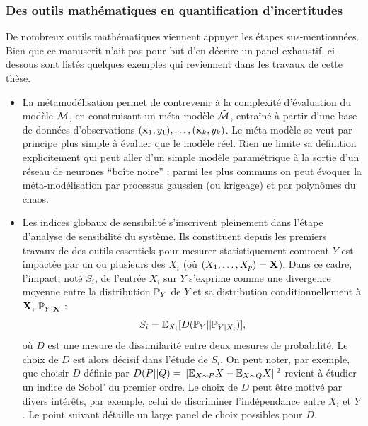 \subsubsection{Des outils mathématiques en quantification d'incertitudes}

De nombreux outils mathématiques viennent appuyer les étapes sus-mentionnées. Bien que ce manuscrit n'ait pas pour but d'en décrire un panel exhaustif, ci-dessous sont listés quelques exemples qui reviennent dans les travaux de cette thèse.

\begin{itemize}
    \item La métamodélisation %
    permet de contrevenir à la complexité d'évaluation du modèle $\mathcal{M}$, en construisant un méta-modèle $\tilde{\mathcal{M}}$, entraîné à partir d'une base de données d'observations $(\mathbf{x}_1, y_1),\dots,(\mathbf{x}_k,y_k)$. Le méta-modèle se veut par principe plus simple à évaluer que le modèle réel. 
    Rien ne limite sa définition explicitement qui peut aller d'un simple modèle paramétrique à la sortie d'un réseau de neurones ``boîte noire'' ; parmi les plus communs on peut évoquer la méta-modélisation par processus gaussien (ou krigeage) et par polynômes du chaos. %
    \item Les indices globaux de sensibilité s'inscrivent pleinement dans l'étape d'analyse de sensibilité du système.
    Ils constituent depuis les premiers travaux de \citet{sobol_sensitivity_1993} des outils essentiels pour mesurer statistiquement comment $ Y$ est impactée par un ou plusieurs des $X_i$ (où $(X_1,\dots,X_p)=\mathbf{X}$). Dans ce cadre, l'impact, noté $S_i$, de l'entrée $X_i$ sur $ Y$ s'exprime comme une divergence moyenne entre la distribution $\mathbb{P}_{ Y}$ de $ Y$ et sa distribution conditionnellement à $\mathbf{X}$, $\mathbb{P}_{Y|\mathbf{X}}$ \citep{da_veiga_global_2015} : 
        \begin{equation}
            S_i = \mathbb{E}_{X_i}[D(\mathbb{P}_{ Y}||\mathbb{P}_{Y|X_i})],
        \end{equation}
    où $D$ est une mesure de dissimilarité entre deux mesures de probabilité.
    Le choix de $D$ est alors décisif dans l'étude de $S_i$. %
    On peut noter, par exemple, que choisir $D$ définie par $D(P||Q) = \|\mathbb{E}_{X\sim P}X-\mathbb{E}_{X\sim Q}X\|^2$ revient à étudier un indice de Sobol' du premier ordre.
    Le choix de $D$ peut être motivé par divers intérêts, par exemple, celui de discriminer  l'indépendance entre $X_i$ et $ Y$. Le point suivant détaille un large panel de choix possibles pour $D$.


\end{itemize}

